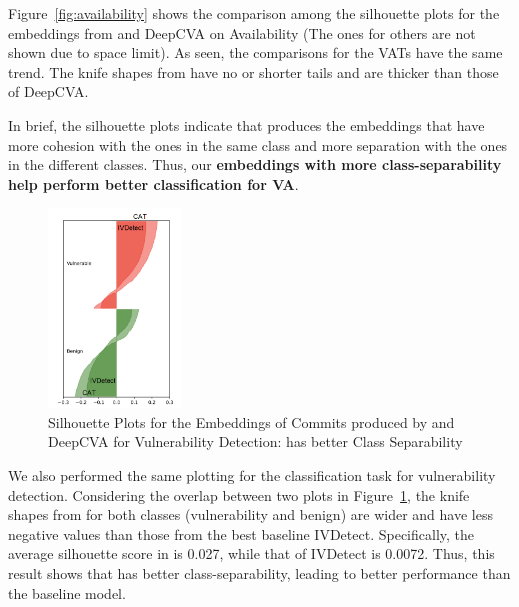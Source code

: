 Figure~\ref{fig:availability} shows the comparison among the
silhouette plots for the embeddings from {\tool} and DeepCVA on
Availability (The ones for others are not shown due to space limit).
As seen, the comparisons for the VATs have the same trend. The knife
shapes from {\tool} have no or shorter tails and are thicker than
those of DeepCVA.

In brief, the silhouette plots indicate that {\tool} produces the
embeddings that have more cohesion with the ones in the same class and
more separation with the ones in the different classes. Thus, our {\bf
embeddings with more class-separability help {\tool} perform better
classification for VA}.



\begin{figure}[t]
	\centering
	\includegraphics[width=1.4in]{graphs/plot-vd}
       \vspace{-6pt}
	\caption{Silhouette Plots for the Embeddings of Commits produced by {\tool} and DeepCVA for Vulnerability Detection: {\tool} has better Class Separability}
	\label{fig:vd}
\end{figure}

We also performed the same plotting for the classification task for
vulnerability detection. Considering the overlap between two plots in
Figure~\ref{fig:vd}, the knife shapes from {\tool} for both classes
(vulnerability and benign) are wider and have less negative values
than those from the best baseline IVDetect. Specifically, the average
silhouette score in {\tool} is 0.027, while that of IVDetect is
0.0072. Thus, this result shows that {\tool} has better
class-separability, leading to better performance than the baseline
model.
